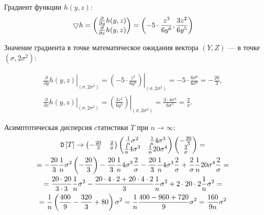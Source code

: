 Градиент функции $h(y,z)$:
\begin{equation}
    \bigtriangledown h
    = \begin{pmatrix}
          \frac{\partial}{\partial y} h(y,z) \\ \frac{\partial}{\partial z} h(y,z)
    \end{pmatrix}
    = \left ( -5 \cdot \frac{z^3}{6 y^6} , \frac{3 z^2}{6 y^5}\right )
\end{equation}

Значение градиента в точке математическое ожидания вектора $(Y, Z)$ --- в точке $\left ( \sigma, 2 \sigma^2 \right )$:

\begin{gather}
    \left . \frac{\partial}{\partial y} h(y,z) \right |_{\left ( \sigma, 2 \sigma^2 \right )}
    = \left . \left ( -5 \cdot \frac{z^3}{6 y^6} \right ) \right |_{\left ( \sigma, 2 \sigma^2 \right )}
    = -5 \cdot \frac{8 \sigma^6}{6 \sigma^6}
    = - \frac{20}{3} , \\
    \left . \frac{\partial}{\partial z} h(y,z) \right |_{\left ( \sigma, 2 \sigma^2 \right )}
    = \left . \left (  \frac{3 z^2}{6 y^5} \right ) \right |_{\left ( \sigma, 2 \sigma^2 \right )}
    = \frac{ 3 \cdot 4 \sigma^4 }{6 \sigma^5 }
    = \frac{2}{\sigma} .
\end{gather}

Асимптотическая дисперсия cтатистики $T$ при $n \rightarrow \infty$:
\begin{multline}
    \mathtt{D} \left [ T \right ] \rightarrow
    \begin{pmatrix}
        - \frac{20}{3} &
        \frac{2}{\sigma}
    \end{pmatrix}
    \begin{pmatrix}
        \frac{1}{n} \sigma^2   & \frac{1}{n} 4 \sigma^3  \\
        \frac{1}{n} 4 \sigma^3 & \frac{1}{n} 20 \sigma^4
    \end{pmatrix}
    \begin{pmatrix}
        - \frac{20}{3} \\
        \frac{2}{\sigma}
    \end{pmatrix} = \\
    = - \frac{20}{3} \frac{1}{n} \sigma^2 \left ( - \frac{20}{3} \right )
    - \frac{20}{3} \frac{1}{n} 4 \sigma^3 \frac{2}{\sigma}
    - \frac{20}{3} \frac{1}{n} 4 \sigma^3 \frac{2}{\sigma}
    + \frac{2}{\sigma} \frac{1}{n} 20 \sigma^4 \frac{2}{\sigma} = \\
    = \frac{20 \cdot 20}{3 \cdot 3} \frac{1}{n} \sigma^2
    - \frac{20 \cdot 4 \cdot 2 + 20 \cdot 4 \cdot 2}{3} \frac{1}{n} \sigma^2
    + 2 \cdot 20 \cdot 2 \frac{1}{n} \sigma^2 = \\
    = \frac{1}{n} \left ( \frac{400}{9} - \frac{320}{3} + 80 \right ) \sigma^2
    = \frac{1}{n} \frac{400 - 960 + 720}{9} \sigma^2
    = \frac{160}{9 n} \sigma^2
\end{multline}

